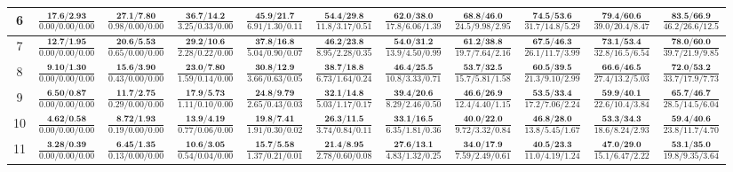 \documentclass{slides}
\begin{document}
{{{\begin{tabular}{|c|c|c|c|c|c|c|c|c|c|c|}
\hline
6 & $\frac{\textbf{17.6/2.93}}{0.00/0.00/0.00}$ & $\frac{\textbf{27.1/7.80}}{0.98/0.00/0.00}$ & $\frac{\textbf{36.7/14.2}}{3.25/0.33/0.00}$ & $\frac{\textbf{45.9/21.7}}{6.91/1.30/0.11}$ & $\frac{\textbf{54.4/29.8}}{11.8/3.17/0.51}$ & $\frac{\textbf{62.0/38.0}}{17.8/6.06/1.39}$ & $\frac{\textbf{68.8/46.0}}{24.5/9.98/2.95}$ & $\frac{\textbf{74.5/53.6}}{31.7/14.8/5.29}$ & $\frac{\textbf{79.4/60.6}}{39.0/20.4/8.47}$ & $\frac{\textbf{83.5/66.9}}{46.2/26.6/12.5}$ \\
\hline
7 & $\frac{\textbf{12.7/1.95}}{0.00/0.00/0.00}$ & $\frac{\textbf{20.6/5.53}}{0.65/0.00/0.00}$ & $\frac{\textbf{29.2/10.6}}{2.28/0.22/0.00}$ & $\frac{\textbf{37.8/16.8}}{5.04/0.90/0.07}$ & $\frac{\textbf{46.2/23.8}}{8.95/2.28/0.35}$ & $\frac{\textbf{54.0/31.2}}{13.9/4.50/0.99}$ & $\frac{\textbf{61.2/38.8}}{19.7/7.64/2.16}$ & $\frac{\textbf{67.5/46.3}}{26.1/11.7/3.99}$ & $\frac{\textbf{73.1/53.4}}{32.8/16.5/6.54}$ & $\frac{\textbf{78.0/60.0}}{39.7/21.9/9.85}$ \\
\hline
8 & $\frac{\textbf{9.10/1.30}}{0.00/0.00/0.00}$ & $\frac{\textbf{15.6/3.90}}{0.43/0.00/0.00}$ & $\frac{\textbf{23.0/7.80}}{1.59/0.14/0.00}$ & $\frac{\textbf{30.8/12.9}}{3.66/0.63/0.05}$ & $\frac{\textbf{38.7/18.8}}{6.73/1.64/0.24}$ & $\frac{\textbf{46.4/25.5}}{10.8/3.33/0.71}$ & $\frac{\textbf{53.7/32.5}}{15.7/5.81/1.58}$ & $\frac{\textbf{60.5/39.5}}{21.3/9.10/2.99}$ & $\frac{\textbf{66.6/46.5}}{27.4/13.2/5.03}$ & $\frac{\textbf{72.0/53.2}}{33.7/17.9/7.73}$ \\
\hline
9 & $\frac{\textbf{6.50/0.87}}{0.00/0.00/0.00}$ & $\frac{\textbf{11.7/2.75}}{0.29/0.00/0.00}$ & $\frac{\textbf{17.9/5.73}}{1.11/0.10/0.00}$ & $\frac{\textbf{24.8/9.79}}{2.65/0.43/0.03}$ & $\frac{\textbf{32.1/14.8}}{5.03/1.17/0.17}$ & $\frac{\textbf{39.4/20.6}}{8.29/2.46/0.50}$ & $\frac{\textbf{46.6/26.9}}{12.4/4.40/1.15}$ & $\frac{\textbf{53.5/33.4}}{17.2/7.06/2.24}$ & $\frac{\textbf{59.9/40.1}}{22.6/10.4/3.84}$ & $\frac{\textbf{65.7/46.7}}{28.5/14.5/6.04}$ \\
\hline
10 & $\frac{\textbf{4.62/0.58}}{0.00/0.00/0.00}$ & $\frac{\textbf{8.72/1.93}}{0.19/0.00/0.00}$ & $\frac{\textbf{13.9/4.19}}{0.77/0.06/0.00}$ & $\frac{\textbf{19.8/7.41}}{1.91/0.30/0.02}$ & $\frac{\textbf{26.3/11.5}}{3.74/0.84/0.11}$ & $\frac{\textbf{33.1/16.5}}{6.35/1.81/0.36}$ & $\frac{\textbf{40.0/22.0}}{9.72/3.32/0.84}$ & $\frac{\textbf{46.8/28.0}}{13.8/5.45/1.67}$ & $\frac{\textbf{53.3/34.3}}{18.6/8.24/2.93}$ & $\frac{\textbf{59.4/40.6}}{23.8/11.7/4.70}$ \\
\hline
11 & $\frac{\textbf{3.28/0.39}}{0.00/0.00/0.00}$ & $\frac{\textbf{6.45/1.35}}{0.13/0.00/0.00}$ & $\frac{\textbf{10.6/3.05}}{0.54/0.04/0.00}$ & $\frac{\textbf{15.7/5.58}}{1.37/0.21/0.01}$ & $\frac{\textbf{21.4/8.95}}{2.78/0.60/0.08}$ & $\frac{\textbf{27.6/13.1}}{4.83/1.32/0.25}$ & $\frac{\textbf{34.0/17.9}}{7.59/2.49/0.61}$ & $\frac{\textbf{40.5/23.3}}{11.0/4.19/1.24}$ & $\frac{\textbf{47.0/29.0}}{15.1/6.47/2.22}$ & $\frac{\textbf{53.1/35.0}}{19.8/9.35/3.64}$ \\

\end{tabular}}}}
\end{document}
